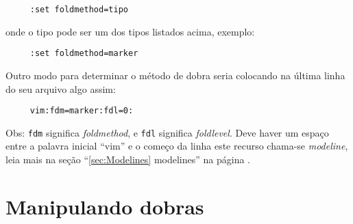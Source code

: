 \begin{verbatim}
     :set foldmethod=tipo
\end{verbatim}

onde o tipo pode ser um dos tipos listados acima, exemplo:

\begin{verbatim}
     :set foldmethod=marker
\end{verbatim}

Outro modo para determinar o método de dobra seria colocando na última
linha do seu arquivo algo assim:

\begin{verbatim}
     vim:fdm=marker:fdl=0:
\end{verbatim}

Obs: \verb|fdm| significa {\em foldmethod}, e \verb|fdl| significa
{\em foldlevel}. Deve haver um espaço entre a palavra inicial ``vim'' e o
começo da linha este recurso chama-se {\em modeline}, leia mais na seção
``\ref{sec:Modelines} modelines'' na página \pageref{sec:Modelines}.

\section{Manipulando dobras }
\label{Manipulando dobras }


